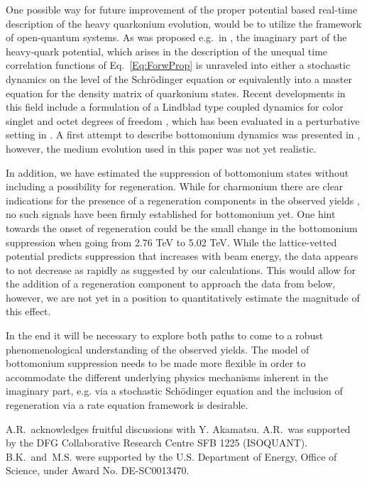 One possible way for future improvement of the proper potential based real-time description of the heavy quarkonium evolution, would be to utilize the framework of open-quantum systems. As was proposed e.g.~in \cite{Akamatsu:2011se}, the imaginary part of the heavy-quark potential, which arises in the description of the unequal time correlation functions of Eq.~\eqref{Eq:ForwProp} is unraveled into either a stochastic dynamics on the level of the Schr\"odinger equation or equivalently into a master equation for the density matrix of quarkonium states. Recent developments in this field include a formulation of a Lindblad type coupled dynamics for color singlet and octet degrees of freedom \cite{Akamatsu:2014qsa,Akamatsu:2015kaa,DeBoni:2017ocl}, which has been evaluated in a perturbative setting in \cite{Brambilla:2016wgg}. A first attempt to describe bottomonium dynamics was presented in \cite{Rothkopf:2013kya}, however, the medium evolution used in this paper was not yet realistic.

In addition, we have estimated the suppression of bottomonium states without including a possibility for regeneration. While for charmonium there are clear indications for the presence of a regeneration components in the observed yields \cite{Rapp:2017chc}, no such signals have been firmly established for bottomonium yet. One hint towards the onset of regeneration could be the small change in the bottomonium suppression when going from 2.76 TeV to 5.02 TeV. While the lattice-vetted potential predicts suppression that increases with beam energy, the data appears to not decrease as rapidly as suggested by our calculations.  This would allow for the addition of a regeneration component to approach the data from below, however, we are not yet in a position to quantitatively estimate the magnitude of this effect.

In the end it will be necessary to explore both paths to come to a robust phenomenological understanding of the observed yields. The model of bottomonium suppression needs to be made more flexible in order to accommodate the different underlying physics mechanisms inherent in the imaginary part, e.g. via a stochastic Sch\"odinger equation and the inclusion of regeneration via a rate equation framework is desirable.


\acknowledgements

A.R.~acknowledges fruitful discussions with Y. Akamatsu. A.R.~was supported by the DFG Collaborative Research Centre SFB
1225 (ISOQUANT).  B.K.~and~M.S. were supported by the U.S. Department of Energy, Office of Science, under Award No. DE-SC0013470.